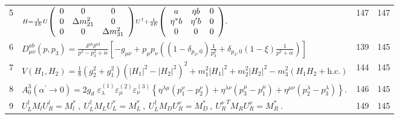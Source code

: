 \documentclass{article}
\begin{document}
\begin{figure*}
\begin{tabular}{llcc}
\scriptsize{5} & $\scriptstyle{H = \frac { 1 } { 2 E } U \left( \begin{array} { c c c } { 0 } & { 0 } & { 0 } \\ { 0 } & { \Delta m _ { 2 1 } ^ { 2 } } & { 0 } \\ { 0 } & { 0 } & { \Delta m _ { 3 1 } ^ { 2 } } \\ \end{array} \right) U ^ { \dagger } + \frac { 1 } { 2 E } \left( \begin{array} { c c c } { a } & { \eta b } & { 0 } \\ { \eta ^ { * } b } & { \eta ^ { \prime } b } & { 0 } \\ { 0 } & { 0 } & { 0 } \\ \end{array} \right) , }$ & \scriptsize{147} & \scriptsize{147} \\
\scriptsize{6} & $\scriptstyle{D _ { \mu \nu } ^ { a b } ( p , p _ { 3 } ) = \frac { \delta ^ { a b } \delta ^ { a 3 } } { p ^ { 2 } - p _ { 3 } ^ { 2 } + i \epsilon } \left[ - g _ { \mu \nu } + p _ { \mu } p _ { \nu } \left( ( 1 - \delta _ { p _ { 3 } , 0 } ) \frac { 1 } { p _ { 3 } ^ { 2 } } + \delta _ { p _ { 3 } , 0 } ( 1 - \xi ) \frac { 1 } { p ^ { 2 } + i \epsilon } \right) \right] }$ & \scriptsize{139} & \scriptsize{145} \\
\scriptsize{7} & $\scriptstyle{V ( H _ { 1 } , H _ { 2 } ) = \frac { 1 } { 8 } ( g _ { 2 } ^ { 2 } + g _ { 1 } ^ { 2 } ) \left( | H _ { 1 } | ^ { 2 } - | H _ { 2 } | ^ { 2 } \right) ^ { 2 } + m _ { 1 } ^ { 2 } | H _ { 1 } | ^ { 2 } + m _ { 2 } ^ { 2 } | H _ { 2 } | ^ { 2 } - m _ { 3 } ^ { 2 } ( H _ { 1 } H _ { 2 } + \mathrm { h . c . } ) }$ & \scriptsize{144} & \scriptsize{145} \\
\scriptsize{8} & $\scriptstyle{A _ { 0 } ^ { 3 } ( \alpha ^ { \prime } \rightarrow 0 ) = 2 g _ { d } \, \, \varepsilon _ { \lambda } ^ { ( 1 ) } \varepsilon _ { \mu } ^ { ( 2 ) } \varepsilon _ { \nu } ^ { ( 3 ) } \left\{ \eta ^ { \lambda \mu } \left( p _ { 1 } ^ { \nu } - p _ { 2 } ^ { \nu } \right) + \eta ^ { \lambda \nu } \left( p _ { 3 } ^ { \mu } - p _ { 1 } ^ { \mu } \right) + \eta ^ { \mu \nu } \left( p _ { 2 } ^ { \lambda } - p _ { 3 } ^ { \lambda } \right) \right\} . }$ & \scriptsize{146} & \scriptsize{145} \\
\scriptsize{9} & $\scriptstyle{U _ { L } ^ { \dagger } M _ { l } U _ { R } ^ { l } = M _ { l } ^ { * } ~ , ~ U _ { L } ^ { \dagger } M _ { L } U _ { L } ^ { * } = M _ { L } ^ { * } ~ , ~ U _ { L } ^ { \dagger } M _ { D } U _ { R } ^ { \nu } = M _ { D } ^ { * } ~ , ~ { U _ { R } ^ { \nu } } ^ { T } M _ { R } U _ { R } ^ { \nu } = M _ { R } ^ { * } ~ . }$ & \scriptsize{149} & \scriptsize{145} \\

\end{tabular}
\end{figure*}
\end{document}
